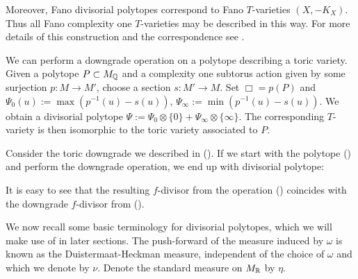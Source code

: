 Moreover, Fano divisorial polytopes correspond to Fano \(T\)-varieties \((X,-K_X)\). Thus all Fano complexity one \(T\)-varieties may be described in this way. For more details of this construction and the correspondence see \cite{suss2013fano}.
\begin{example}
We can perform a downgrade operation on a polytope describing a toric variety. Given a polytope \(P \subset M_{\mathbb{Q}}\) and a complexity one subtorus action given by some surjection \(p:M \to M'\), choose a section \(s: M' \to M\). Set \(\Box = p(P)\) and \(\Psi_0(u) := \max( p^{-1}(u) - s(u))\), \(\Psi_\infty := \min(p^{-1}(u) - s(u))\). We obtain a divisorial polytope \(\Psi := \Psi_0 \otimes \{0\} + \Psi_\infty \otimes \{\infty\}\). The corresponding \(T\)-variety is then isomorphic to the toric variety associated to \(P\).
\end{example}
\begin{example}
Consider the toric downgrade we described in (). If we start with the polytope () and perform the downgrade operation, we end up with divisorial polytope:

\begin{figure}[H]
\centering

\label{fig:data230b}
\end{figure}

It is easy to see that the resulting \(f\)-divisor from the operation () coincides with the downgrade \(f\)-divisor from ().
\end{example}
We now recall some basic terminology for divisorial polytopes, which we will make use of in later sections. The push-forward of the measure induced by \(\omega\) is known as the Duistermaat-Heckman measure, independent of the choice of \(\omega\) and which we denote by \(\nu\). Denote the standard measure on \(M_{\mathbb{R}}\) by \(\eta\).


